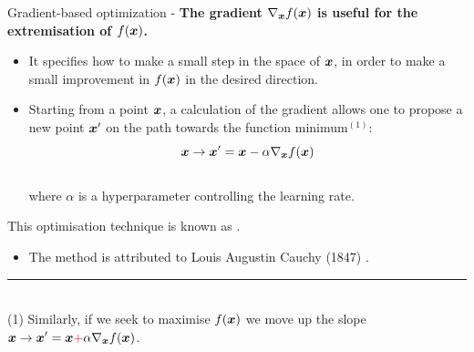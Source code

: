\begin{frame}[t,allowframebreaks]{Gradient-based optimization -}
    {\bf The \gls{gradient} $\nabla_{\boldsymbol{x}} f(\boldsymbol{x})$ 
    is useful for the 
    \gls{extremisation} of $f(\boldsymbol{x})$.}\\
    \vspace{0.2cm}
    \begin{itemize}
        \item
            It specifies how to make a small step in the space of $\boldsymbol{x}$, 
            in order to make a small improvement in $f(\boldsymbol{x})$ 
            in the desired direction.\\
            \vspace{0.1cm}
        \item
            Starting from a point $\boldsymbol{x}$, a calculation of 
            the \gls{gradient} allows one to
            propose a new point $\boldsymbol{x}^\prime$ 
            on the path towards the function minimum$^{(1)}$:
            \begin{equation}
                \boldsymbol{x} \rightarrow \boldsymbol{x}^\prime = 
                    \boldsymbol{x} - \alpha \nabla_{\boldsymbol{x}} f(\boldsymbol{x})
                \label{eq:grad_descent_1}
            \end{equation}\\
            where $\alpha$ is a \gls{hyperparameter}
            controlling the \gls{learning rate}.
    \end{itemize}

    \vspace{0.1cm}

    This \gls{optimisation} 
    technique is known as 
    .
    \begin{itemize}
      \item The method is attributed to Louis Augustin Cauchy (1847)
       \cite{Cauchy:GradientDescent}.\\
    \end{itemize}

    \vspace{0.1cm}
    \noindent\rule{4cm}{0.4pt}\\
    {\tiny
    (1) Similarly, if we seek to maximise $f(\boldsymbol{x})$ 
    we move up the slope
    $\displaystyle \vect{x} \rightarrow \vect{x}^\prime =
      \vect{x} {\color{cadmiumred}+} \alpha \nabla_{\vect{x}} f(\vect{x})$.\\
    }

    \framebreak


\end{frame}
